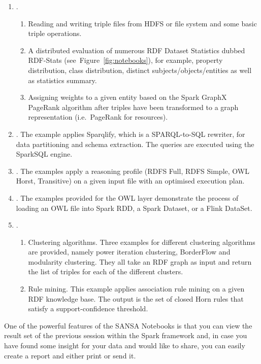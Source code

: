 \begin{enumerate}
    \item {}.
    \begin{enumerate}
      \item Reading and writing triple files from HDFS or file system and some basic triple operations.
      \item A distributed evaluation of numerous RDF Dataset Statistics dubbed RDF-Stats (see~Figure~\ref{fig:notebooks}), for example, property distribution, class distribution, distinct subjects/objects/entities as well as statistics summary.
      \item Assigning weights to a given entity based on the Spark GraphX PageRank algorithm after triples have been transformed to a graph representation (i.e.~PageRank for resources).
    \end{enumerate}
    \item {}. 
    The example applies Sparqlify, which is a SPARQL-to-SQL rewriter, for data partitioning and schema extraction. The queries are executed using the SparkSQL engine.
    \item {}. The examples apply a reasoning profile (RDFS Full, RDFS Simple, OWL Horst, Transitive) on a given input file with an optimised execution plan.
    \item {}. The examples provided for the OWL layer demonstrate the process of loading an OWL file into Spark RDD, a Spark Dataset, or a Flink DataSet.
    \item {}.
    \begin{enumerate}
        \item Clustering algorithms. Three examples for different clustering algorithms are provided, namely power iteration clustering, BorderFlow and modularity clustering. 
        They all take an RDF graph as input and return the list of triples for each of the different clusters.
        \item Rule mining. This example applies association rule mining on a given RDF knowledge base. The output is the set of closed Horn rules that satisfy a support-confidence threshold.
    \end{enumerate}
\end{enumerate}

One of the powerful features of the SANSA Notebooks is that you can view the result set of the previous session within the Spark framework and, in case you have found some insight for your data and would like to share, you can easily create a report and either print or send it.


